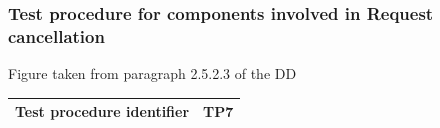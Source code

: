 \documentclass[a4paper,11pt]{report} %
\begin{document}
			\subsubsection{Test procedure for components involved in Request cancellation}
				\begin{minipage}{\linewidth}
				\end{minipage}
				\begin{center}
					Figure taken from paragraph 2.5.2.3 of the DD
				\end{center} 			
				\begin{center}
					\begin{tabular}{| l | p{10cm} |}\hline
						\textbf{Test procedure identifier} & TP7\\\hline
					\end{tabular}
				\end{center}	
		\pagebreak					
\end{document}
